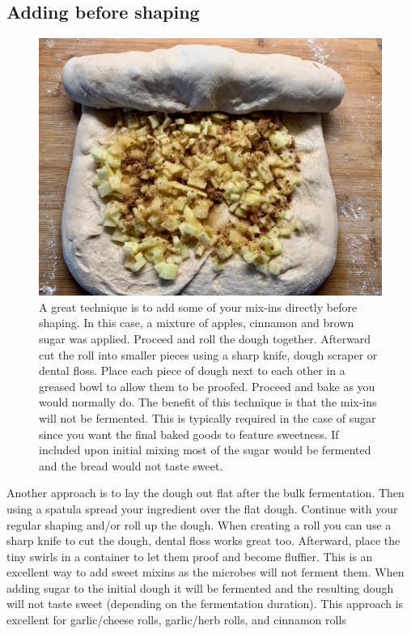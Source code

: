 \subsection{Adding before shaping}

\begin{figure}[htb!]
  \includegraphics[width=\textwidth]{apple-swirl}
  \caption[Apple swirl buns]{A great technique is to add some of your mix-ins
  directly before shaping. In this case, a mixture of apples, cinnamon and brown
  sugar was applied. Proceed and roll the dough together. Afterward cut the roll
  into smaller pieces using a sharp knife, dough scraper or dental floss. Place
  each piece of dough next to each other in a greased bowl to allow them to be proofed.
  Proceed and bake as you would normally do. The benefit of this technique is that
  the mix-ins will not be fermented. This is typically required in the case of sugar
  since you want the final baked goods to feature sweetness. If included upon
  initial mixing most of the sugar would be fermented and the bread would not taste sweet.}%
\end{figure}

Another approach is to lay the dough out flat after the bulk fermentation.
Then using a spatula spread your ingredient over the flat dough. Continue with
your regular shaping and/or roll up the dough. When creating a roll you can
use a sharp knife to cut the dough, dental floss works great too. Afterward,
place the tiny swirls in a container to let them proof and become fluffier. This is an
excellent way to add sweet mixins as the microbes will not ferment them. When
adding sugar to the initial dough it will be fermented and the resulting dough
will not taste sweet (depending on the fermentation duration). This approach
is excellent for garlic/cheese rolls, garlic/herb rolls, and cinnamon rolls

